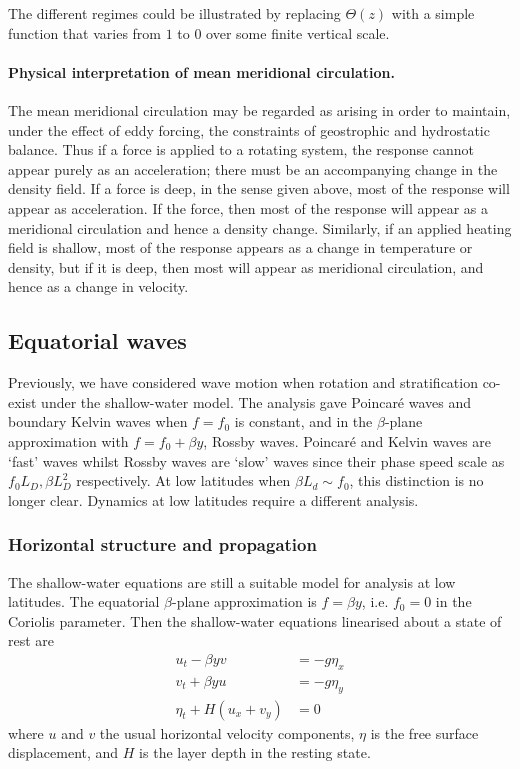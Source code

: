 \documentclass{jknotes}
\begin{document}
The different regimes could be illustrated by replacing $\Theta(z)$ with a
simple function that varies from $1$ to $0$ over some finite vertical scale. 

\paragraph{Physical interpretation of mean meridional circulation.} The mean
meridional circulation may be regarded as arising in order to maintain, under
the effect of eddy forcing, the constraints of geostrophic and hydrostatic
balance. Thus if a force is applied to a rotating system, the response cannot
appear purely as an acceleration; there must be an accompanying change in the
density field. If a force is deep, in the sense given above, most of the
response will appear as acceleration. If the force, then most of the response
will appear as a meridional circulation and hence a density change. Similarly,
if an applied heating field is shallow, most of the response appears as a
change in temperature or density, but if it is deep, then most will appear as
meridional circulation, and hence as a change in velocity. 

\subsection{Equatorial waves}
Previously, we have considered wave motion when rotation and stratification
co-exist under the shallow-water model. The analysis gave Poincar\'{e} waves
and boundary Kelvin waves when $f = f_0$ is constant, and in the $\beta$-plane
approximation with $f = f_0 + \beta y$, Rossby waves. Poincar\'{e} and Kelvin
waves are `fast' waves whilst Rossby waves are `slow' waves since their
phase speed scale as $f_0 L_D, \beta L_D^2$ respectively. At low latitudes
when $\beta L_d \sim f_0$, this distinction is no longer clear. Dynamics at
low latitudes require a different analysis.

\subsubsection{Horizontal structure and propagation}
The shallow-water equations are still a suitable model for analysis at low
latitudes. The equatorial $\beta$-plane approximation is $f = \beta y$, i.e.
$f_0 = 0$ in the Coriolis parameter. Then the shallow-water equations
linearised about a state of rest are
\begin{align}
	u_t - \beta y v &= - g \eta_x \label{eq:sweq1} \\
	v_t + \beta y u &= - g \eta_y \label{eq:sweq2} \\
	\eta_t + H(u_x + v_y) &= 0\label{eq:sweq3}
\end{align}
where $u$ and $v$ the usual horizontal velocity components, $\eta$ is the free
surface displacement, and $H$ is the layer depth in the resting state.
\end{document}
